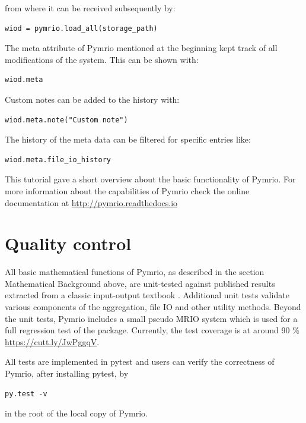 \documentclass{jors}
\begin{document}
from where it can be received subsequently by:

\begin{lstlisting}
wiod = pymrio.load_all(storage_path)
\end{lstlisting}

The meta attribute of Pymrio mentioned at the beginning kept track of all modifications of the system.
This can be shown with:

\begin{lstlisting}
wiod.meta
\end{lstlisting}

Custom notes can be added to the history with:
\begin{lstlisting}
wiod.meta.note("Custom note")
\end{lstlisting}


The history of the meta data can be filtered for specific entries like:

\begin{lstlisting}
wiod.meta.file_io_history
\end{lstlisting}


This tutorial gave a short overview about the basic functionality of Pymrio. 
For more information about the capabilities of Pymrio check the online documentation at 
\url{http://pymrio.readthedocs.io} 
\cite{stadler2018_pymrio}



\section*{Quality control}

All basic mathematical functions of Pymrio, as described in the section Mathematical Background above, are unit-tested against published results extracted from a classic input-output textbook \cite{miller2009_Inputoutput}.
Additional unit tests validate various components of the aggregation, file IO and other utility methods.
Beyond the unit tests, Pymrio includes a small pseudo MRIO system which is used for a full regression test of the package. Currently, the test coverage is at around 90 \% \url{https://cutt.ly/JwPggqV}. 

All tests are implemented in pytest and users can verify the correctness of Pymrio, after installing pytest, by

\begin{lstlisting}
py.test -v
\end{lstlisting}

in the root of the local copy of Pymrio.
\end{document}
